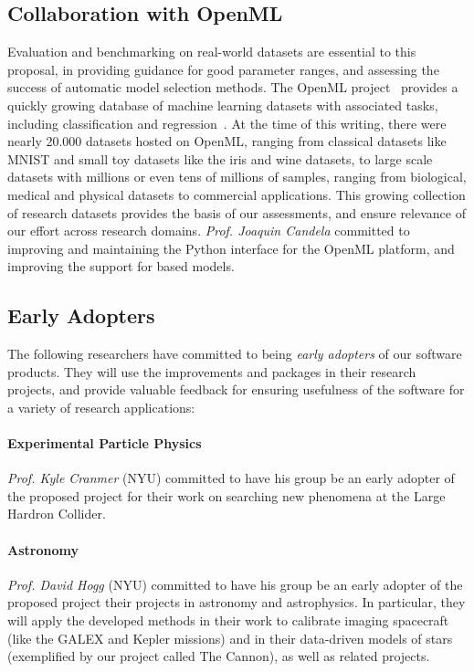 \subsection{Collaboration with OpenML}
Evaluation and benchmarking on real-world datasets are essential to this
proposal, in providing guidance for good parameter ranges, and assessing the
success of automatic model selection methods. The OpenML
project~\autocite{van2013openml} provides a quickly growing database of machine
learning datasets with associated tasks, including classification and
regression~\autocite{vanschoren2014openml}. At the time of this writing, there
were nearly 20.000 datasets hosted on OpenML, ranging from classical datasets
like MNIST and small toy datasets like the iris and wine datasets, to large
scale datasets with millions or even tens of millions of samples, ranging from
biological, medical and physical datasets to commercial applications. This
growing collection of research datasets provides the basis of our assessments,
and ensure relevance of our effort across research domains. \emph{Prof. Joaquin
Candela} committed to improving and maintaining the Python interface for the
OpenML platform, and improving the support for \sklearn{} based models.

\subsection{Early Adopters}
The following researchers have committed to being \emph{early adopters} of our
software products. They will use the improvements and packages in their
research projects, and provide valuable feedback for ensuring usefulness of the
software for a variety of research applications:

\paragraph{Experimental Particle Physics}
\emph{Prof. Kyle Cranmer} (NYU) committed to have his group be an early adopter of the
proposed project for their work on searching new phenomena at the Large Hardron
Collider.

\paragraph{Astronomy}
\emph{Prof. David Hogg} (NYU) committed to have his group be an
early adopter of the proposed project their projects in astronomy and
astrophysics. In particular, they will apply the developed methods in their
work to calibrate imaging spacecraft (like the GALEX and Kepler missions) and
in their data-driven models of stars (exemplified by our project called The
Cannon), as well as related projects.

